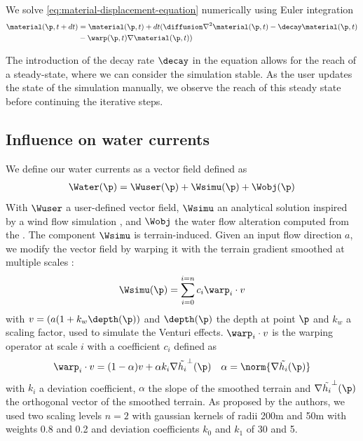 We solve \eqref{eq:material-displacement-equation} numerically using Euler integration
\begin{align}
    \material(\p, t + dt) &= \material(\p, t) + dt ( \diffusion \nabla^2 \material(\p, t) - \decay \material(\p, t) \\ & - \warp(\p, t) \nabla \material(\p, t) ) \nonumber
\end{align}

The introduction of the decay rate $\decay$ in the equation allows for the reach of a steady-state, where we can consider the simulation stable. As the user updates the state of the simulation manually, we observe the reach of this steady state before continuing the iterative steps.

\subsection{Influence on water currents}
\label{sec:semantic-representation_water-currents}
We define our water currents as a vector field defined as 
\begin{align*}
    \Water(\p) = \Wuser(\p) + \Wsimu(\p) + \Wobj(\p)
\end{align*}
With $\Wuser$ a user-defined vector field, $\Wsimu$ an analytical solution inspired by a wind flow simulation \cite{Paris2020}, and $\Wobj$ the water flow alteration computed from the . 
The component $\Wsimu$ is terrain-induced. Given an input flow direction $a$, we modify the vector field by warping it with the terrain gradient smoothed at multiple scales :
\begin{align*}
    \Wsimu(\p) = \sum_{i=0}^{i=n}{c_i \warp_i \cdot v}
\end{align*}
with $v = (a (1 + k_w \depth(\p))$ and $\depth(\p)$ the depth at point $\p$ and $k_w$ a scaling factor, used to simulate the Venturi effects. $\warp_i \cdot v$ is the warping operator at scale $i$ with a coefficient $c_i$ defined as 
\begin{align*}
& \warp_i \cdot v = (1 - \alpha) v + \alpha k_i \nabla \Tilde{h_i}^{\perp}(\p) & \alpha = \norm{ \nabla \Tilde{h_i}(\p) }
\end{align*}
with $k_i$ a deviation coefficient, $\alpha$ the slope of the smoothed terrain and $\nabla \Tilde{h_i}^{\perp}(\p)$ the orthogonal vector of the smoothed terrain. As proposed by the authors, we used two scaling levels $n = 2$ with gaussian kernels of radii \si{200}{m} and \si{50}{m} with weights 0.8 and 0.2 and deviation coefficients $k_0$ and $k_1$ of 30 and 5.

